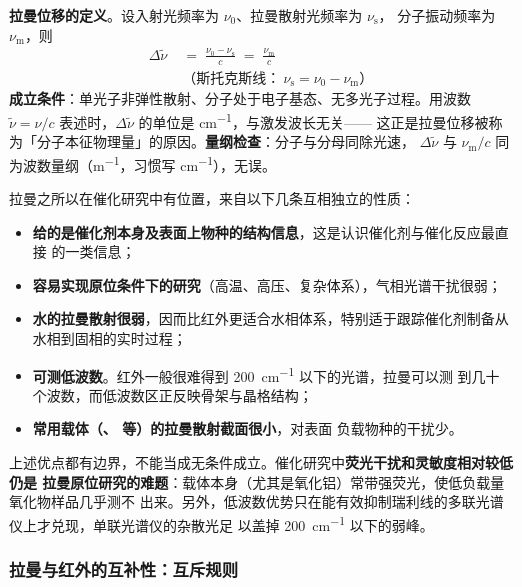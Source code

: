 \begin{principle}
\textbf{拉曼位移的定义}。设入射光频率为 $\nu_0$、拉曼散射光频率为 $\nu_{\mathrm{s}}$，
分子振动频率为 $\nu_{\mathrm{m}}$，则
\begin{equation}
\begin{aligned}
\Delta \tilde\nu \;&=\; \frac{\nu_0-\nu_{\mathrm{s}}}{c} \;=\; \frac{\nu_{\mathrm{m}}}{c}\\[1pt]
&\text{（斯托克斯线：}\ \nu_{\mathrm{s}}=\nu_0-\nu_{\mathrm{m}}\text{）}
\end{aligned}
\label{eq:raman-shift}
\end{equation}
\textbf{成立条件}：单光子非弹性散射、分子处于电子基态、无多光子过程。用波数
$\tilde\nu=\nu/c$ 表述时，$\Delta\tilde\nu$ 的单位是 \unit{cm^{-1}}，与激发波长无关——
这正是拉曼位移被称为「分子本征物理量」的原因。\textbf{量纲检查}：分子与分母同除光速，
$\Delta\tilde\nu$ 与 $\nu_{\mathrm{m}}/c$ 同为波数量纲（\unit{m^{-1}}，习惯写
\unit{cm^{-1}}），无误。
\end{principle}

拉曼之所以在催化研究中有位置，来自以下几条互相独立的性质：

\begin{itemize}
\item \textbf{给的是催化剂本身及表面上物种的结构信息}，这是认识催化剂与催化反应最直接
  的一类信息；
\item \textbf{容易实现原位条件下的研究}（高温、高压、复杂体系），气相光谱干扰很弱；
\item \textbf{水的拉曼散射很弱}，因而比红外更适合水相体系，特别适于跟踪催化剂制备从
  水相到固相的实时过程；
\item \textbf{可测低波数}。红外一般很难得到 \qty{200}{cm^{-1}} 以下的光谱，拉曼可以测
  到几十个波数，而低波数区正反映骨架与晶格结构；
\item \textbf{常用载体（、 等）的拉曼散射截面很小}，对表面
  负载物种的干扰少。
\end{itemize}

\begin{pitfall}
上述优点都有边界，不能当成无条件成立。催化研究中\textbf{荧光干扰和灵敏度相对较低仍是
拉曼原位研究的难题}：载体本身（尤其是氧化铝）常带强荧光，使低负载量氧化物样品几乎测不
出来。另外，低波数优势只在能有效抑制瑞利线的多联光谱仪上才兑现，单联光谱仪的杂散光足
以盖掉 \qty{200}{cm^{-1}} 以下的弱峰。
\end{pitfall}

\subsubsection{拉曼与红外的互补性：互斥规则}

